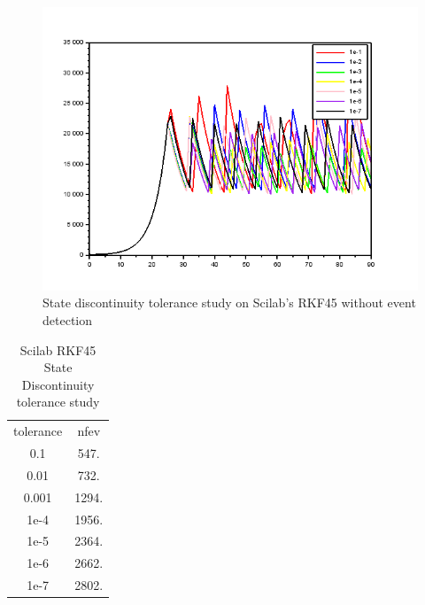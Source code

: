 \begin{figure}[h]
	\centering
	\includegraphics[width=0.7\linewidth]{./figures/tolerance_state_rk45_no_event_sci}
	\caption{State discontinuity tolerance study on Scilab's RKF45 without event detection}
	\label{fig:tolerance_state_rk45_no_event_sci}
\end{figure}

\begin{table}[h]
\caption {Scilab RKF45 State Discontinuity tolerance study} \label{tab:tolerance_state_discontinuity_rk45_scilab} 
\begin{center}
\begin{tabular}{ c c }
tolerance & nfev \\ 
   0.1    & 547. \\
   0.01   & 732. \\
   0.001  & 1294. \\
   1e-4   & 1956. \\
   1e-5   & 2364. \\
   1e-6   & 2662. \\
   1e-7   & 2802. \\
\end{tabular}
\end{center}
\end{table}